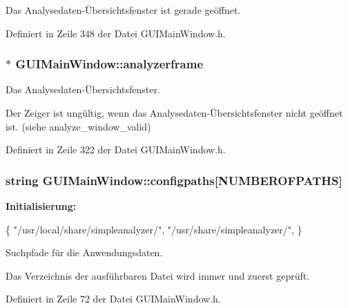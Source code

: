 Das Analysedaten-\/Übersichtsfenster ist gerade geöffnet. 



Definiert in Zeile 348 der Datei G\-U\-I\-Main\-Window.\-h.

\hypertarget{classGUIMainWindow_a20e7a8cf498df1c1c0059711b487837b}{
\subsubsection[{analyzerframe}]{$\ast$ G\-U\-I\-Main\-Window\-::analyzerframe\hspace{0.3cm}{\ttfamily [private]}}}\label{classGUIMainWindow_a20e7a8cf498df1c1c0059711b487837b}


Das Analysedaten-\/Übersichtsfenster. 

Der Zeiger ist ungültig, wenn das Analysedaten-\/Übersichtsfenster nicht geöffnet ist. (siehe analyze\-\_\-window\-\_\-valid) 

Definiert in Zeile 322 der Datei G\-U\-I\-Main\-Window.\-h.

\hypertarget{classGUIMainWindow_abc81190b8fea79f68a476028f11272b1}{
\subsubsection[{configpaths}]{\setlength{\rightskip}{0pt plus 5cm}string G\-U\-I\-Main\-Window\-::configpaths\mbox{[}{\bf N\-U\-M\-B\-E\-R\-O\-F\-P\-A\-T\-H\-S}\mbox{]}\hspace{0.3cm}{\ttfamily [protected]}}}\label{classGUIMainWindow_abc81190b8fea79f68a476028f11272b1}
{\bfseries Initialisierung\-:}
\begin{DoxyCode}
\{
            \textcolor{stringliteral}{"/usr/local/share/simpleanalyzer/"},
            \textcolor{stringliteral}{"/usr/share/simpleanalyzer/"},
    \}
\end{DoxyCode}


Suchpfade für die Anwendungsdaten. 

Das Verzeichnis der ausführbaren Datei wird immer und zuerst geprüft. 

Definiert in Zeile 72 der Datei G\-U\-I\-Main\-Window.\-h.

